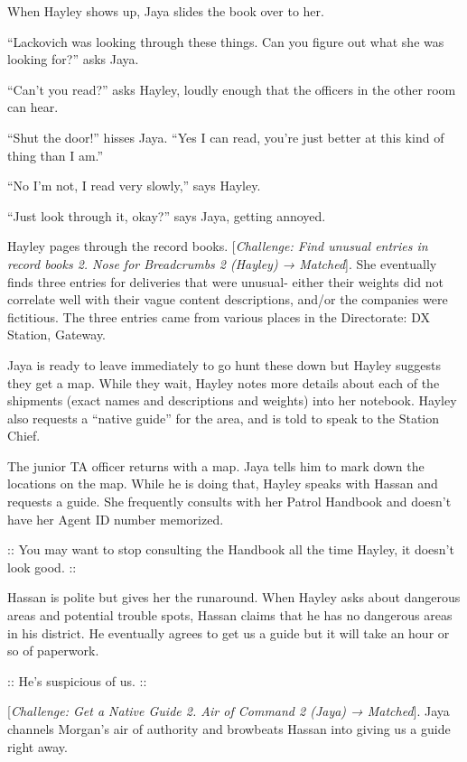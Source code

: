 When Hayley shows up, Jaya slides the book over to her.

``Lackovich was looking through these things.  Can you figure out what she was looking for?'' asks Jaya.

``Can't you read?'' asks Hayley, loudly enough that the officers in the other room can hear.

``Shut the door!'' hisses Jaya.  ``Yes I can read, you're just better at this kind of thing than I am.''

``No I'm not, I read very slowly,'' says Hayley.

``Just look through it, okay?'' says Jaya, getting annoyed.

Hayley pages through the record books.  {[}\textit{Challenge: Find unusual entries in record books 2.  Nose for Breadcrumbs 2 (Hayley) → Matched}{]}.  She eventually finds three entries for deliveries that were unusual- either their weights did not correlate well with their vague content descriptions, and/or the companies were fictitious.  The three entries came from various places in the Directorate: DX Station, Gateway.



Jaya is ready to leave immediately to go hunt these down but Hayley suggests they get a map.  While they wait, Hayley notes more details about each of the shipments (exact names and descriptions and weights) into her notebook.  Hayley also requests a ``native guide'' for the area, and is told to speak to the Station Chief.



The junior TA officer returns with a map.  Jaya tells him to mark down the locations on the map.  While he is doing that, Hayley speaks with Hassan and requests a guide.  She frequently consults with her Patrol Handbook and doesn't have her Agent ID number memorized.  

:: {\color[RGB]{106,168,79}You may want to stop consulting the Handbook all the time Hayley, it doesn't look good.} ::

Hassan is polite but gives her the runaround.  When Hayley asks about dangerous areas and potential trouble spots, Hassan claims that he has no dangerous areas in his district.  He eventually agrees to get us a guide but it will take an hour or so of paperwork.

:: {\color[RGB]{60,120,216}He's suspicious of us.} ::

{[}\textit{Challenge: Get a Native Guide 2.  Air of Command 2 (Jaya) → Matched}{]}.  Jaya channels Morgan's air of authority and browbeats Hassan into giving us a guide right away.  



